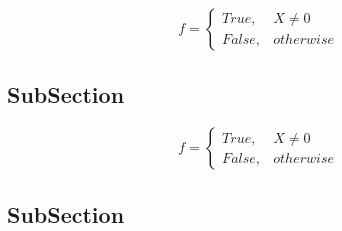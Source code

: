 \documentclass[a4paper]{article}
\begin{document}
\begin{equation}   f =
\begin{cases} True, & X \neq 0\\
False, & otherwise
\end{cases}
\end{equation}

\subsection{SubSection}

\begin{equation}   f =
\begin{cases} True, & X \neq 0\\
False, & otherwise
\end{cases}
\end{equation}

\subsection{SubSection}
\end{document}
